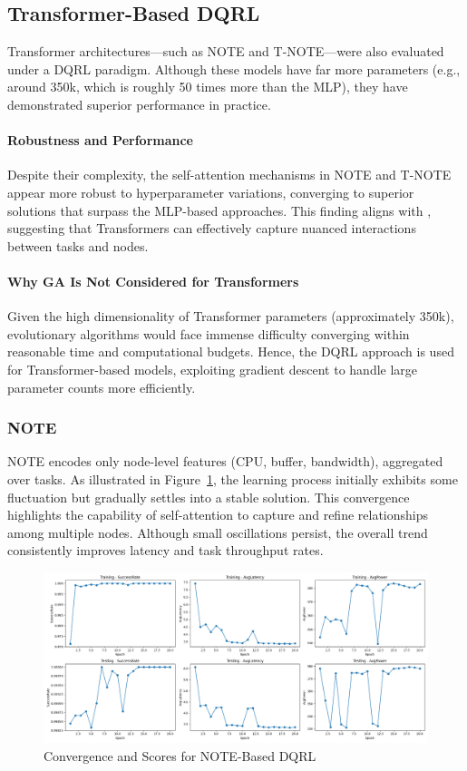 \documentclass[preprint,12pt]{elsarticle}
\begin{document}
\subsection{Transformer-Based DQRL}
\label{subsec:transformer_perf}

Transformer architectures—such as NOTE and T-NOTE—were also evaluated under a DQRL paradigm. Although these models have far more parameters (e.g., around 350k, which is roughly 50 times more than the MLP), they have demonstrated superior performance in practice. 

\paragraph{Robustness and Performance}
Despite their complexity, the self-attention mechanisms in NOTE and T-NOTE appear more robust to hyperparameter variations, converging to superior solutions that surpass the MLP-based approaches. This finding aligns with \cite{gholipour_tpto_2023}, suggesting that Transformers can effectively capture nuanced interactions between tasks and nodes. 

\paragraph{Why GA Is Not Considered for Transformers}
Given the high dimensionality of Transformer parameters (approximately 350k), evolutionary algorithms would face immense difficulty converging within reasonable time and computational budgets. Hence, the DQRL approach is used for Transformer-based models, exploiting gradient descent to handle large parameter counts more efficiently.

\subsubsection{NOTE}
NOTE encodes only node-level features (CPU, buffer, bandwidth), aggregated over tasks. As illustrated in Figure~\ref{fig:nOTE-score-plot}, the learning process initially exhibits some fluctuation but gradually settles into a stable solution. This convergence highlights the capability of self-attention to capture and refine relationships among multiple nodes. Although small oscillations persist, the overall trend consistently improves latency and task throughput rates.

\begin{figure}[H]
    \centering
    \includegraphics[width=1\linewidth]{figs/nodeformer_score_plot.png}
    \caption{Convergence and Scores for NOTE-Based DQRL}
    \label{fig:nOTE-score-plot}
\end{figure}
\end{document}
